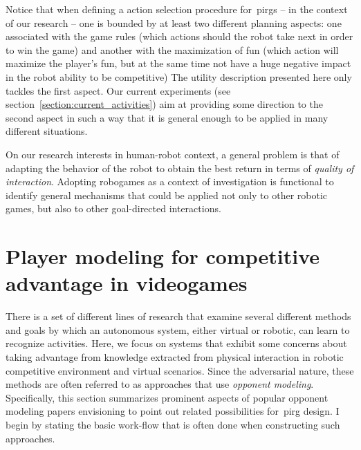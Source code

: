 

Notice that when defining a action selection procedure for~\gls{pirg}s -- in the context of our research -- one is bounded by at least two different planning aspects: one associated with the game rules (which actions should the robot take next in order to win the game) and another with the maximization of fun (which action will maximize the player's fun, but at the same time not have a huge negative impact in the robot ability to be competitive) The utility description presented here only tackles the first aspect. Our current experiments (see section~\ref{section:current_activities}) aim at providing some direction to the second aspect in such a way that it is general enough to be applied in many different situations. 

On our research interests in human-robot context, a general problem is that of adapting the behavior of the robot to obtain the best return in terms of \textit{quality of interaction}. Adopting robogames as a context of investigation is functional to identify general mechanisms that could be applied not only to other robotic games, but also to other goal-directed interactions.

\section{Player modeling for competitive advantage in videogames}\label{compadvantage}
There is a set of different lines of research that examine several different methods and goals by which an autonomous system, either virtual or robotic, can learn to recognize activities. Here, we focus on systems that exhibit some concerns about taking advantage from knowledge extracted from physical interaction in robotic competitive environment and virtual scenarios. Since the adversarial nature, these methods are often referred to as approaches that use \textit{opponent modeling}.  Specifically, this section summarizes prominent aspects of popular opponent modeling papers envisioning to point out related possibilities for~\gls{pirg} design. I begin by stating the basic work-flow that is often done when constructing such approaches. 

